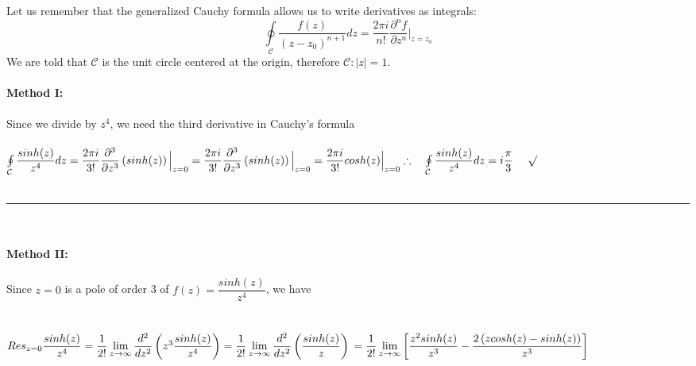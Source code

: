 \documentclass[fleqn]{article}
\begin{document}
\begin{enumerate}
        \textcolor{hwColor}{
          Let us remember that the generalized Cauchy formula allows us to write derivatives as integrals:
          $$\oint\limits_{\mathcal C} \dfrac{f(z)}{(z-z_0)^{n+1}}dz=\dfrac{2 \pi i}{n!} \dfrac{\partial^n f}{\partial z^n} \Big|_{z=z_0}$$
          We are told that $\mathcal{C}$ is the unit circle centered at the origin, therefore $\mathcal{C}:|z|=1$. 
          \\
          \\
          \textbf{Method I:} \\
          \\
          Since we divide by $z^4$, we need the third derivative in Cauchy's formula \\ \\
          $
            \oint\limits_{\mathcal C} \dfrac{sinh(z)}{z^4} dz=\dfrac{2 \pi i}{3!} \dfrac{\partial^3}{\partial z^3} \left(sinh(z)\right) \Big|_{z=0}
            =\dfrac{2 \pi i}{3!} \dfrac{\partial^3}{\partial z^3} \left(sinh(z)\right) \Big|_{z=0}
            =\dfrac{2 \pi i}{3!} cosh(z) \Big|_{z=0}
            \\
            \\
            \\
            \therefore ~~~ \oint\limits_{\mathcal C} \dfrac{sinh(z)}{z^4} dz=i\dfrac{\pi}{3} ~~~~ \surd
          $ 
          \\
          \\
          \rule{15cm}{1pt}
          \\
          \\
          \textbf{Method II:} \\
          \\
          Since $z=0$ is a pole of order 3 of $f(z)=\dfrac{sinh(z)}{z^4}$, we have \\
          \\
          \\
          $
            Res_{z=0} \dfrac{sinh(z)}{z^4}=\dfrac{1}{2!} \lim\limits_{z\to\infty} \dfrac{d^2}{dz^2} \left(z^3 \dfrac{sinh(z)}{z^4}\right)
            =\dfrac{1}{2!} \lim\limits_{z\to\infty} \dfrac{d^2}{dz^2} \left(\dfrac{sinh(z)}{z}\right) \\
            \\
            \\
            =\dfrac{1}{2!} \lim\limits_{z\to\infty} \left[\dfrac{z^2 sinh(z)}{z^3}-\dfrac{2 \left(z cosh(z)-sinh(z)\right)}{z^3}\right]
          $
          \\
          \\
}
\end{enumerate}
\end{document}

